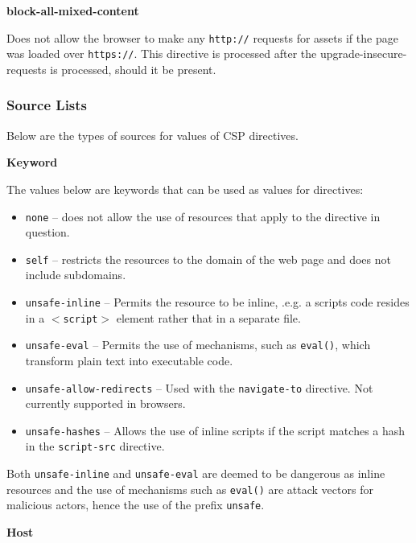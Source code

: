\documentclass{mscreport}
\begin{document}
\vspace{0.7cm} \noindent
\textbf{block-all-mixed-content}

\vspace{0.3cm} \noindent
Does not allow the browser to make any \texttt{http://} requests for assets if the page was loaded over \texttt{https://}. This directive is processed after the upgrade-insecure-requests is processed, should it be present.

\subsubsection{Source Lists}

Below are the types of sources for values of CSP directives.


\vspace{0.7cm} \noindent
\textbf{Keyword}

\vspace{0.3cm} \noindent
The values below are keywords that can be used as values for directives:
\begin{itemize}
	\setlength\itemsep{0.1em}
	\item \texttt{none} – does not allow the use of resources that apply to the directive in question.
	\item \texttt{self} – restricts the resources to the domain of the web page and does not include subdomains.
	\item \texttt{unsafe-inline} – Permits the resource to be inline, .e.g. a scripts code resides in a \texttt{$<$script$>$} element rather that in a separate file.
	\item \texttt{unsafe-eval} – Permits the use of mechanisms, such as \texttt{eval()}, which transform plain text into executable code.
	\item \texttt{unsafe-allow-redirects} – Used with the \texttt{navigate-to} directive. Not currently supported in browsers.
	\item \texttt{unsafe-hashes} – Allows the use of inline scripts if the script matches a hash in the \texttt{script-src} directive.
	
\end{itemize}

\noindent
Both \texttt{unsafe-inline} and \texttt{unsafe-eval} are deemed to be dangerous as inline resources and the use of mechanisms such as \texttt{eval()} are attack vectors for malicious actors, hence the use of the prefix \texttt{unsafe}.

\vspace{0.7cm} \noindent
\textbf{Host}
\end{document}
